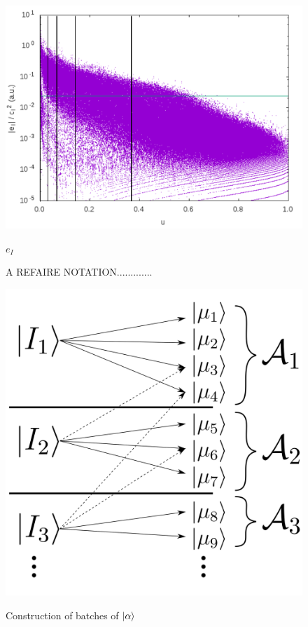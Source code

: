 \documentclass[./thesis.tex]{subfiles}
\begin{document}
\begin{figure}[h!]
	\begin{center}
		\includegraphics[width=0.9\columnwidth]{figures/pt2/eici2comb}
		\caption{A REFAIRE NOTATION.............}
		\label{fig:eici2comb}
		$e_I$
	\end{center}
\end{figure}




\begin{figure}[h!]
	\begin{center}
		\includegraphics[width=0.5\columnwidth]{figures/pt2/mu_sample}
		\caption{}
		\label{fig:mu_sample}
		Construction of batches of $\ket \alpha$
	\end{center}
\end{figure}

\clearpage
\end{document}
